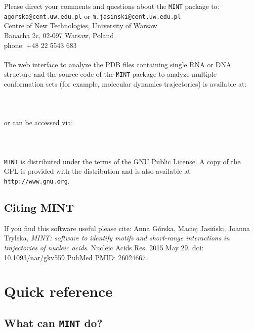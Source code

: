 \documentclass[12pt]{article}
\begin{document}
\noindent
Please direct your comments and questions about the {\tt MINT} package to:\\
{\tt{agorska@cent.uw.edu.pl}} or {\tt{m.jasinski@cent.uw.edu.pl}}\\
Centre of New Technologies,
University of Warsaw\\
Banacha 2c, 02-097 Warsaw, Poland\\
phone:  $+$48 22 5543 683 \\ 
\\
The web interface to analyze the PDB files containing single RNA or DNA structure and the source code of the {\tt MINT} package to analyze multiple conformation sets (for example, molecular dynamics trajectories) is available at:\\
\\
{}\\
\\
\noindent
or can be accessed via:\\
\\ 
{}\\
\\
{\tt MINT} is distributed under the terms of the GNU Public License. 
A copy of the GPL is provided with the distribution and is also available at {\color{Blue}\tt{http://www.gnu.org}}. \\

\subsection{Citing MINT}
\noindent
If you find this software useful please cite: Anna G\'{o}rska, Maciej Jasi\'{n}ski, Joanna Trylska, 
\textit{MINT: software to identify motifs and short-range interactions in trajectories of nucleic acids}. Nucleic Acids Res. 2015 May 29. doi: 10.1093/nar/gkv559 PubMed PMID: 26024667. 
\newpage
\section{Quick reference}
\subsection{What can {\tt MINT} do?}
\end{document}
